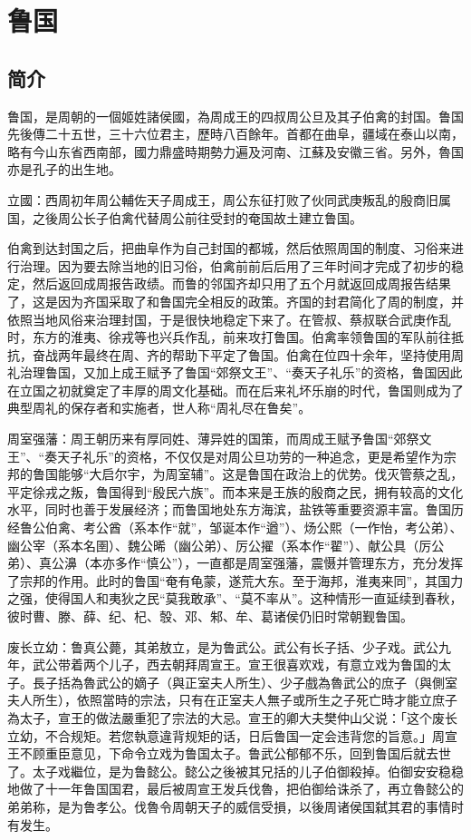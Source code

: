
\section{鲁国}

\subsection{简介}

鲁国，是周朝的一個姬姓諸侯國，為周成王的四叔周公旦及其子伯禽的封国。鲁国先後傳二十五世，三十六位君主，歷時八百餘年。首都在曲阜，疆域在泰山以南，略有今山东省西南部，國力鼎盛時期勢力遍及河南、江蘇及安徽三省。另外，魯国亦是孔子的出生地。

立國：西周初年周公輔佐天子周成王，周公东征打败了伙同武庚叛乱的殷商旧属国，之後周公长子伯禽代替周公前往受封的奄国故土建立鲁国。

伯禽到达封国之后，把曲阜作为自己封国的都城，然后依照周国的制度、习俗来进行治理。因为要去除当地的旧习俗，伯禽前前后后用了三年时间才完成了初步的稳定，然后返回成周报告政绩。而鲁的邻国齐却只用了五个月就返回成周报告结果了，这是因为齐国采取了和鲁国完全相反的政策。齐国的封君简化了周的制度，并依照当地风俗来治理封国，于是很快地稳定下来了。在管叔、蔡叔联合武庚作乱时，东方的淮夷、徐戎等也兴兵作乱，前来攻打鲁国。伯禽率领鲁国的军队前往抵抗，奋战两年最终在周、齐的帮助下平定了鲁国。伯禽在位四十余年，坚持使用周礼治理鲁国，又加上成王赋予了鲁国“郊祭文王”、“奏天子礼乐”的资格，鲁国因此在立国之初就奠定了丰厚的周文化基础。而在后来礼坏乐崩的时代，鲁国则成为了典型周礼的保存者和实施者，世人称“周礼尽在鲁矣”。

周室强藩：周王朝历来有厚同姓、薄异姓的国策，而周成王赋予鲁国“郊祭文王”、“奏天子礼乐”的资格，不仅仅是对周公旦功劳的一种追念，更是希望作为宗邦的鲁国能够“大启尔宇，为周室辅”。这是鲁国在政治上的优势。伐灭管蔡之乱，平定徐戎之叛，鲁国得到“殷民六族”。而本来是王族的殷商之民，拥有较高的文化水平，同时也善于发展经济；而鲁国地处东方海滨，盐铁等重要资源丰富。鲁国历经鲁公伯禽、考公酋（系本作“就”，邹诞本作“遒”）、炀公熙（一作怡，考公弟）、幽公宰（系本名圉）、魏公晞（幽公弟）、厉公擢（系本作“翟”）、献公具（厉公弟）、真公濞（本亦多作“慎公”），一直都是周室强藩，震慑并管理东方，充分发挥了宗邦的作用。此时的鲁国“奄有龟蒙，遂荒大东。至于海邦，淮夷来同”，其国力之强，使得国人和夷狄之民“莫我敢承”、“莫不率从”。这种情形一直延续到春秋，彼时曹、滕、薛、纪、杞、彀、邓、邾、牟、葛诸侯仍旧时常朝觐鲁国。

废长立幼：鲁真公薨，其弟敖立，是为鲁武公。武公有长子括、少子戏。武公九年，武公带着两个儿子，西去朝拜周宣王。宣王很喜欢戏，有意立戏为鲁国的太子。長子括為魯武公的嫡子（與正室夫人所生）、少子戲為魯武公的庶子（與側室夫人所生），依照當時的宗法，只有在正室夫人無子或所生之子死亡時才能立庶子為太子，宣王的做法嚴重犯了宗法的大忌。宣王的卿大夫樊仲山父说：「这个废长立幼，不合规矩。若您執意違背规矩的话，日后鲁国一定会违背您的旨意。」周宣王不顾重臣意见，下命令立戏为鲁国太子。鲁武公郁郁不乐，回到鲁国后就去世了。太子戏繼位，是为鲁懿公。懿公之後被其兄括的儿子伯御殺掉。伯御安安稳稳地做了十一年鲁国国君，最后被周宣王发兵伐魯，把伯御给诛杀了，再立魯懿公的弟弟称，是为鲁孝公。伐魯令周朝天子的威信受損，以後周诸侯国弑其君的事情时有发生。

